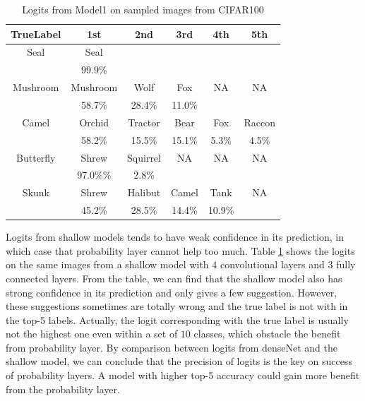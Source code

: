 \documentclass{article}
\begin{document}
{\begin{table}
\begin{center}
\begin{tabular}{ |c|c|c|c|c|c| } 
 \hline
 TrueLabel & 1st & 2nd & 3rd & 4th & 5th \\
 \hline
 Seal   &   Seal  &      &    &  &  \\
        &   99.9\%          &      &      & & \\
 \hline
 Mushroom   &   Mushroom   & Wolf & Fox & NA & NA \\
            &   58.7\%  &   28.4\% &    11.0\%     &&\\
 \hline
 Camel  &   Orchid & Tractor & Bear & Fox & Raccon \\
        &   58.2\%  &   15.5\%   &   15.1\%   &   5.3\%   & 4.5\%  \\    
 \hline
 Butterfly  &   Shrew & Squirrel & NA & NA & NA \\
        &   97.0\%\%  &   2.8\%  &      &      &      \\
 \hline
 Skunk  &   Shrew   &   Halibut &   Camel   &   Tank    &   NA   \\
        &   45.2\%  &   28.5\%  &   14.4\%  &   10.9\%  &       \\
 \hline
\end{tabular}
\end{center}
\caption{Logits from Model1 on sampled images from CIFAR100}
\label{table:logitsSimple}
\end{table}
Logits from shallow models tends to have weak confidence in its prediction, in which case that probability layer cannot help too much. Table \ref{table:logitsSimple} shows the logits on the same images from a shallow model with $4$ convolutional layers and $3$ fully connected layers. From the table, we can find that the shallow model also has strong confidence in its prediction and only gives a few suggestion. However, these suggestions sometimes are totally wrong and the true label is not with in the top-5 labels. Actually, the logit corresponding with the true label is usually not the highest one even within a set of $10$ classes, which obstacle the benefit from probability layer. By comparison between logits from denseNet and the shallow model, we can conclude that the precision of logits is the key on success of probability layers. A model with higher top-5 accuracy could gain more benefit from the probability layer.


}
\end{document}
